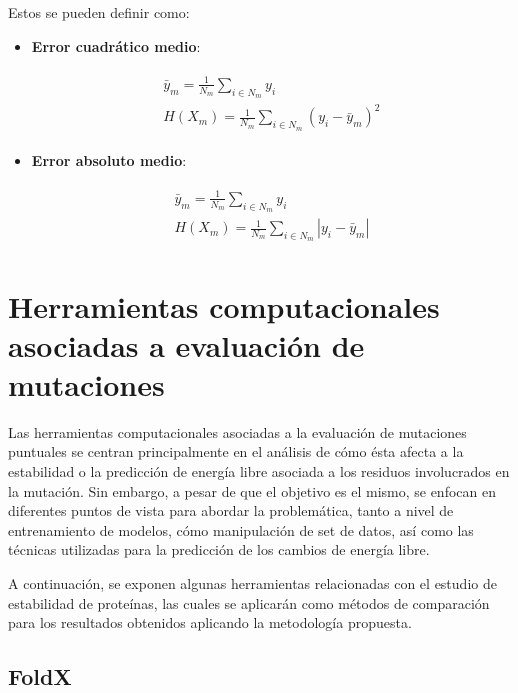 Estos se pueden definir como:

\begin{itemize}
	
	\item \textbf{Error cuadrático medio}: 
	
	\begin{align}\begin{aligned}\bar{y}_m = \frac{1}{N_m} \sum_{i \in N_m} y_i\\H(X_m) = \frac{1}{N_m} \sum_{i \in N_m} (y_i - \bar{y}_m)^2\end{aligned}\end{align}
	
	\item \textbf{Error absoluto medio}: 
	
	\begin{align}\begin{aligned}\bar{y}_m = \frac{1}{N_m} \sum_{i \in N_m} y_i\\H(X_m) = \frac{1}{N_m} \sum_{i \in N_m} |y_i - \bar{y}_m|\end{aligned}\end{align}
\end{itemize}


\section{Herramientas computacionales asociadas a evaluación de mutaciones}

Las herramientas computacionales asociadas a la evaluación de mutaciones puntuales se centran principalmente en el análisis de cómo ésta afecta a la estabilidad o la predicción de energía libre asociada a los residuos involucrados en la mutación. Sin embargo, a pesar de que el objetivo es el mismo, se enfocan en diferentes puntos de vista para abordar la problemática, tanto a nivel de entrenamiento de modelos, cómo manipulación de set de datos, así como las técnicas utilizadas para la predicción de los cambios de energía libre.

A continuación, se exponen algunas herramientas relacionadas con el estudio de estabilidad de proteínas, las cuales se aplicarán como métodos de comparación para los resultados obtenidos aplicando la metodología propuesta.

\subsection{FoldX}

